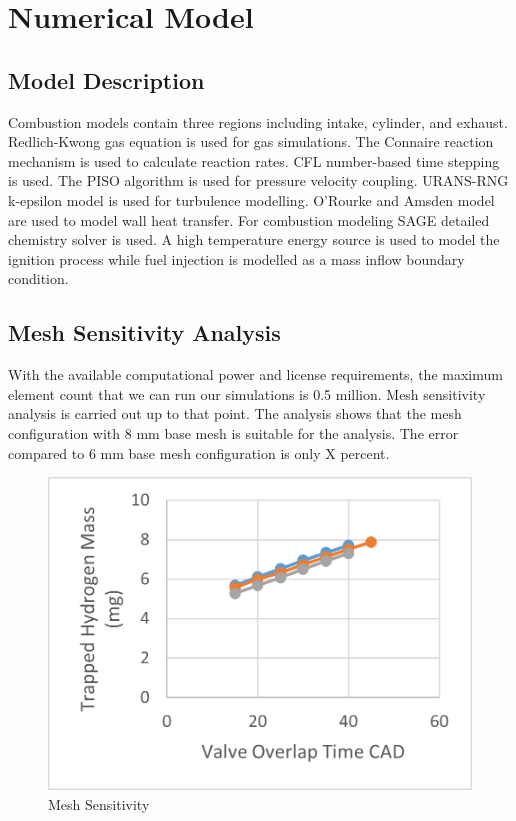 \documentclass[conference]{IEEEtran}
\begin{document}
\section{Numerical Model}
\subsection{Model Description}
Combustion models contain three regions including intake, cylinder, and exhaust. Redlich-Kwong gas equation is used for gas simulations. The Connaire reaction mechanism is used to calculate reaction rates. CFL number-based time stepping is used. The PISO algorithm is used for pressure velocity coupling. URANS-RNG k-epsilon model is used for turbulence modelling. O’Rourke and Amsden model are used to model wall heat transfer. For combustion modeling SAGE detailed chemistry solver is used. A high temperature energy source is used to model the ignition process while fuel injection is modelled as a mass inflow boundary condition.
\subsection{Mesh Sensitivity Analysis}
With the available computational power and license requirements, the maximum element count that we can run our simulations is 0.5 million. Mesh sensitivity analysis is carried out up to that point. The analysis shows that the mesh configuration with 8 mm base mesh is suitable for the analysis. The error compared to 6 mm base mesh configuration is only X percent.
\begin{figure}[htbp]
    \centerline{\includegraphics{Plots/trapped mass.png}}
    \caption{Mesh Sensitivity}
    \label{plt_t}
    \end{figure}
\end{document}
